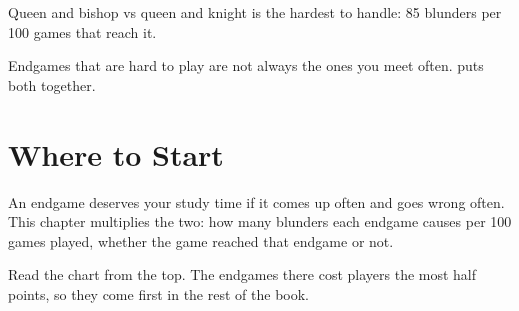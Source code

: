 \begin{keypoints}
\item Queen and bishop vs queen and knight is the hardest to handle: 85 blunders per 100 games that reach it.
\item Endgames that are hard to play are not always the ones you meet often.  puts both together.
\end{keypoints}
\chapter{Where to Start}\label{ch:where-to-start}
An endgame deserves your study time if it comes up often and goes wrong often. This chapter multiplies the two: how many blunders each endgame causes per 100 games played, whether the game reached that endgame or not.

Read the chart from the top. The endgames there cost players the most half points, so they come first in the rest of the book.

